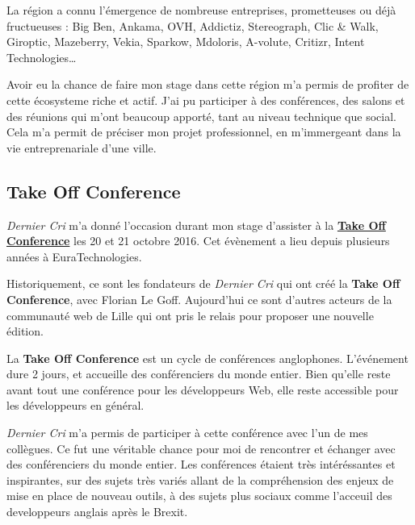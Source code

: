 La région a connu l'émergence de nombreuse entreprises, prometteuses ou
déjà fructueuses : Big Ben, Ankama, OVH, Addictiz, Stereograph, Clic \&
Walk, Giroptic, Mazeberry, Vekia, Sparkow, Mdoloris, A-volute, Critizr,
Intent Technologies\ldots{}

\bigskip

Avoir eu la chance de faire mon stage dans cette région m'a permis de
profiter de cette écosysteme riche et actif. J'ai pu participer à des
conférences, des salons et des réunions qui m'ont beaucoup apporté, tant
au niveau technique que social. Cela m'a permit de préciser mon projet
professionnel, en m'immergeant dans la vie entreprenariale d'une ville.

\bigskip

\subsection{Take Off Conference}\label{take-off-conference}

\bigskip

\emph{Dernier Cri} m'a donné l'occasion durant mon stage d'assister à la
\href{http://takeoffconf.com/2016}{\textbf{Take Off Conference}} les 20
et 21 octobre 2016. Cet évènement a lieu depuis plusieurs années à
EuraTechnologies.

\bigskip

Historiquement, ce sont les fondateurs de \emph{Dernier Cri} qui ont
créé la \textbf{Take Off Conference}, avec Florian Le Goff. Aujourd'hui
ce sont d'autres acteurs de la communauté web de Lille qui ont pris le
relais pour proposer une nouvelle édition.

\bigskip

La \textbf{Take Off Conference} est un cycle de conférences anglophones.
L'événement dure 2 jours, et accueille des conférenciers du monde
entier. Bien qu'elle reste avant tout une conférence pour les
développeurs Web, elle reste accessible pour les développeurs en
général.

\bigskip

\emph{Dernier Cri} m'a permis de participer à cette conférence avec l'un
de mes collègues. Ce fut une véritable chance pour moi de rencontrer et
échanger avec des conférenciers du monde entier. Les conférences étaient
très intéréssantes et inspirantes, sur des sujets très variés allant de
la compréhension des enjeux de mise en place de nouveau outils, à des
sujets plus sociaux comme l'acceuil des developpeurs anglais après le
Brexit.

